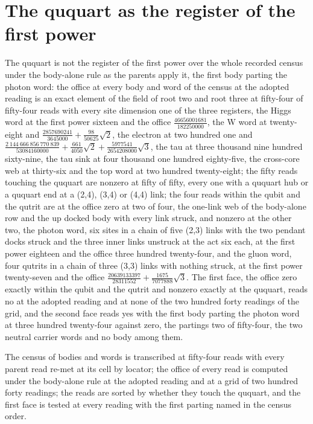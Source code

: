 \section{The ququart as the register of the first power}\label{mod:IV-8f-D542554-w-msrg}
\begin{chwall}\label{box:IV-8f-D542554-w-msrg:1}
The ququart is not the register of the first power over the whole recorded census under the body-alone rule as the parents apply it, the first body parting the photon word: the office at every body and word of the census at the adopted reading is an exact element of the field of root two and root three at fifty-four of fifty-four reads with every site dimension one of the three registers, the Higgs word at the first power sixteen and the office $\tfrac{46656001681}{182250000}$, the W word at twenty-eight and $\tfrac{2857690241}{3645000} + \tfrac{98}{50625}\sqrt{2}$, the electron at two hundred one and $\tfrac{2\ 144\ 666\ 856\ 770\ 839}{53084160000} + \tfrac{661}{4050}\sqrt{2} + \tfrac{5977541}{2654208000}\sqrt{3}$, the tau at three thousand nine hundred sixty-nine, the tau sink at four thousand one hundred eighty-five, the cross-core web at thirty-six and the top word at two hundred twenty-eight; the fifty reads touching the ququart are nonzero at fifty of fifty, every one with a ququart hub or a ququart end at a (2,4), (3,4) or (4,4) link; the four reads within the qubit and the qutrit are at the office zero at two of four, the one-link web of the body-alone row and the up docked body with every link struck, and nonzero at the other two, the photon word, six sites in a chain of five (2,3) links with the two pendant docks struck and the three inner links unstruck at the act six each, at the first power eighteen and the office three hundred twenty-four, and the gluon word, four qutrits in a chain of three (3,3) links with nothing struck, at the first power twenty-seven and the office $\tfrac{20639133397}{28311552} + \tfrac{1675}{7077888}\sqrt{3}$. The first face, the office zero exactly within the qubit and the qutrit and nonzero exactly at the ququart, reads no at the adopted reading and at none of the two hundred forty readings of the grid, and the second face reads yes with the first body parting the photon word at three hundred twenty-four against zero, the partings two of fifty-four, the two neutral carrier words and no body among them.
\end{chwall}
The census of bodies and words is transcribed at fifty-four reads with every parent read re-met at its cell by locator; the office of every read is computed under the body-alone rule at the adopted reading and at a grid of two hundred forty readings; the reads are sorted by whether they touch the ququart, and the first face is tested at every reading with the first parting named in the census order.

